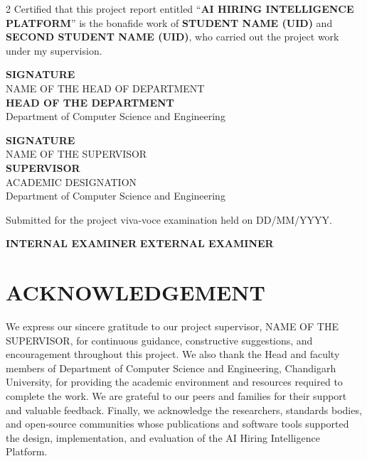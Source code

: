 \documentclass[12pt,a4paper,oneside]{report}
\newcommand{\projecttitle}{AI HIRING INTELLIGENCE PLATFORM}
\newcommand{\studentone}{STUDENT NAME (UID)}
\newcommand{\studenttwo}{SECOND STUDENT NAME (UID)} %
\newcommand{\department}{Department of Computer Science and Engineering}
\newcommand{\hodname}{NAME OF THE HEAD OF DEPARTMENT}
\newcommand{\supervisorname}{NAME OF THE SUPERVISOR}
\newcommand{\supervisordesignation}{ACADEMIC DESIGNATION}
\newcommand{\vivadate}{DD/MM/YYYY}
\begin{document}
\vspace{1.0cm}
\begin{spacing}{2}
\fontsize{14}{20}\selectfont
\noindent Certified that this project report entitled ``\textbf{\projecttitle}'' is the
bonafide work of \textbf{\studentone} and \textbf{\studenttwo}, who carried out the
project work under my supervision.
\end{spacing}

\vspace{1.2cm}
\noindent
\begin{minipage}[t]{0.46\textwidth}
\textbf{SIGNATURE}\\[0.65cm]
\hodname\\
\textbf{HEAD OF THE DEPARTMENT}\\
\department
\end{minipage}
\hfill
\begin{minipage}[t]{0.46\textwidth}
\textbf{SIGNATURE}\\[0.65cm]
\supervisorname\\
\textbf{SUPERVISOR}\\
\supervisordesignation\\
\department
\end{minipage}

\vfill
\noindent Submitted for the project viva-voce examination held on \vivadate.

\vspace{1.1cm}
\noindent
\textbf{INTERNAL EXAMINER}
\hfill
\textbf{EXTERNAL EXAMINER}

\clearpage
{}
\chapter*{ACKNOWLEDGEMENT}
We express our sincere gratitude to our project supervisor, \supervisorname, for
continuous guidance, constructive suggestions, and encouragement throughout this
project. We also thank the Head and faculty members of \department, Chandigarh
University, for providing the academic environment and resources required to
complete the work. We are grateful to our peers and families for their support and
valuable feedback. Finally, we acknowledge the researchers, standards bodies, and
open-source communities whose publications and software tools supported the design,
implementation, and evaluation of the AI Hiring Intelligence Platform.
\end{document}
